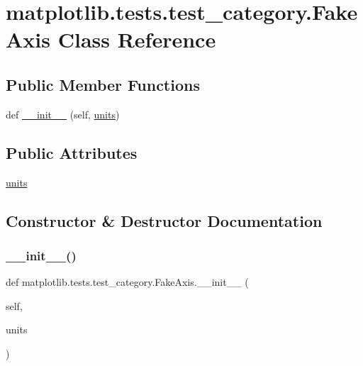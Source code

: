 \hypertarget{classmatplotlib_1_1tests_1_1test__category_1_1FakeAxis}{}\section{matplotlib.\+tests.\+test\+\_\+category.\+Fake\+Axis Class Reference}
\label{classmatplotlib_1_1tests_1_1test__category_1_1FakeAxis}
\subsection*{Public Member Functions}
\begin{DoxyCompactItemize}
\item 
def \hyperlink{classmatplotlib_1_1tests_1_1test__category_1_1FakeAxis_a8e229429a2f7a6b984445c44afb10ae9}{\+\_\+\+\_\+init\+\_\+\+\_\+} (self, \hyperlink{classmatplotlib_1_1tests_1_1test__category_1_1FakeAxis_aa9d379b52b26c1f8083441f32958b9bf}{units})
\end{DoxyCompactItemize}
\subsection*{Public Attributes}
\begin{DoxyCompactItemize}
\item 
\hyperlink{classmatplotlib_1_1tests_1_1test__category_1_1FakeAxis_aa9d379b52b26c1f8083441f32958b9bf}{units}
\end{DoxyCompactItemize}


\subsection{Constructor \& Destructor Documentation}
\mbox{\label{classmatplotlib_1_1tests_1_1test__category_1_1FakeAxis_a8e229429a2f7a6b984445c44afb10ae9}} 
\subsubsection{\texorpdfstring{\+\_\+\+\_\+init\+\_\+\+\_\+()}{\_\_init\_\_()}}
{\footnotesize\ttfamily def matplotlib.\+tests.\+test\+\_\+category.\+Fake\+Axis.\+\_\+\+\_\+init\+\_\+\+\_\+ (\begin{DoxyParamCaption}\item[{}]{self,  }\item[{}]{units }\end{DoxyParamCaption})}



